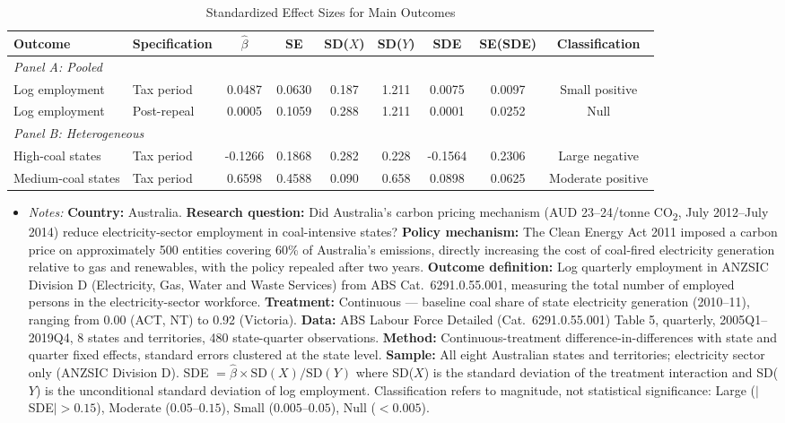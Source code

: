 \begin{table}[H]
\centering
\caption{Standardized Effect Sizes for Main Outcomes}
\label{tab:sde}
\begin{adjustbox}{max width=\textwidth}
\begin{tabular}{llccccccc}
\toprule
Outcome & Specification & $\hat{\beta}$ & SE & SD($X$) & SD($Y$) & SDE & SE(SDE) & Classification \\
\midrule
\multicolumn{9}{l}{\textit{Panel A: Pooled}} \\
Log employment & Tax period & 0.0487 & 0.0630 & 0.187 & 1.211 & 0.0075 & 0.0097 & Small positive \\
Log employment & Post-repeal & 0.0005 & 0.1059 & 0.288 & 1.211 & 0.0001 & 0.0252 & Null \\
\midrule
\multicolumn{9}{l}{\textit{Panel B: Heterogeneous}} \\
High-coal states & Tax period & -0.1266 & 0.1868 & 0.282 & 0.228 & -0.1564 & 0.2306 & Large negative \\
Medium-coal states & Tax period & 0.6598 & 0.4588 & 0.090 & 0.658 & 0.0898 & 0.0625 & Moderate positive \\
\bottomrule
\end{tabular}
\end{adjustbox}
\par\vspace{0.3em}
{\footnotesize
\begin{itemize}[leftmargin=*]
\item \textit{Notes:} \textbf{Country:} Australia. \textbf{Research question:} Did Australia's carbon pricing mechanism (AUD 23--24/tonne CO\textsubscript{2}, July 2012--July 2014) reduce electricity-sector employment in coal-intensive states? \textbf{Policy mechanism:} The Clean Energy Act 2011 imposed a carbon price on approximately 500 entities covering 60\% of Australia's emissions, directly increasing the cost of coal-fired electricity generation relative to gas and renewables, with the policy repealed after two years. \textbf{Outcome definition:} Log quarterly employment in ANZSIC Division D (Electricity, Gas, Water and Waste Services) from ABS Cat.\ 6291.0.55.001, measuring the total number of employed persons in the electricity-sector workforce. \textbf{Treatment:} Continuous --- baseline coal share of state electricity generation (2010--11), ranging from 0.00 (ACT, NT) to 0.92 (Victoria). \textbf{Data:} ABS Labour Force Detailed (Cat.\ 6291.0.55.001) Table 5, quarterly, 2005Q1--2019Q4, 8 states and territories, 480 state-quarter observations. \textbf{Method:} Continuous-treatment difference-in-differences with state and quarter fixed effects, standard errors clustered at the state level. \textbf{Sample:} All eight Australian states and territories; electricity sector only (ANZSIC Division D). SDE $= \hat{\beta} \times \text{SD}(X) / \text{SD}(Y)$ where SD($X$) is the standard deviation of the treatment interaction and SD($Y$) is the unconditional standard deviation of log employment. Classification refers to magnitude, not statistical significance: Large ($|$SDE$| > 0.15$), Moderate ($0.05$--$0.15$), Small ($0.005$--$0.05$), Null ($< 0.005$).
\end{itemize}}
\end{table}

